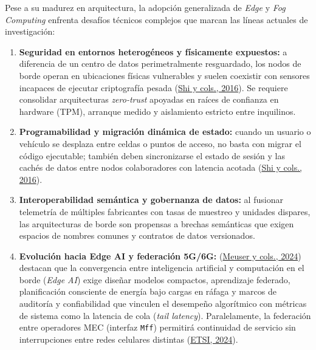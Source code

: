 \documentclass[12pt, letterpaper]{article}
\begin{document}
Pese a su madurez en arquitectura, la adopción generalizada de \textit{Edge} y \textit{Fog Computing} enfrenta desafíos técnicos complejos que marcan las líneas actuales de investigación:

\begin{enumerate}
    \item \textbf{Seguridad en entornos heterogéneos y físicamente expuestos:} a diferencia de un centro de datos perimetralmente resguardado, los nodos de borde operan en ubicaciones físicas vulnerables y suelen coexistir con sensores incapaces de ejecutar criptografía pesada (\protect\hyperlink{shi2016}{Shi y cols., 2016}). Se requiere consolidar arquitecturas \textit{zero-trust} apoyadas en raíces de confianza en hardware (TPM), arranque medido y aislamiento estricto entre inquilinos.
    \item \textbf{Programabilidad y migración dinámica de estado:} cuando un usuario o vehículo se desplaza entre celdas o puntos de acceso, no basta con migrar el código ejecutable; también deben sincronizarse el estado de sesión y las cachés de datos entre nodos colaboradores con latencia acotada (\protect\hyperlink{shi2016}{Shi y cols., 2016}).
    \item \textbf{Interoperabilidad semántica y gobernanza de datos:} al fusionar telemetría de múltiples fabricantes con tasas de muestreo y unidades dispares, las arquitecturas de borde son propensas a brechas semánticas que exigen espacios de nombres comunes y contratos de datos versionados.
    \item \textbf{Evolución hacia Edge AI y federación 5G/6G:} (\protect\hyperlink{meuser2024}{Meuser y cols., 2024}) destacan que la convergencia entre inteligencia artificial y computación en el borde (\textit{Edge AI}) exige diseñar modelos compactos, aprendizaje federado, planificación consciente de energía bajo cargas en ráfaga y marcos de auditoría y confiabilidad que vinculen el desempeño algorítmico con métricas de sistema como la latencia de cola (\textit{tail latency}). Paralelamente, la federación entre operadores MEC (interfaz \texttt{Mff}) permitirá continuidad de servicio sin interrupciones entre redes celulares distintas (\protect\hyperlink{etsi2024}{ETSI, 2024}).
\end{enumerate}

\end{document}
